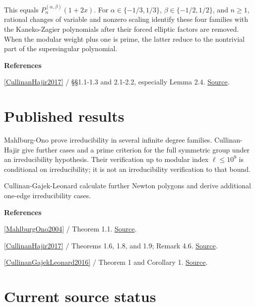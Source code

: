 \documentclass[11pt,a4paper,oneside,openany]{book}
\newcommand{\atlasdisplay}[1]{\par\begingroup\centering\vspace{3pt}\noindent\adjustbox{max width=\linewidth}{\(\displaystyle #1\)}\par\vspace{5pt}\endgroup}
\newenvironment{sources}{\par\smallskip\begingroup\footnotesize\color{atlasgray}\leftskip=10pt\setlength{\parskip}{2pt}}{\par\endgroup\smallskip}
\begin{document}
\atlasdisplay{J_n^{(\alpha,\beta)}(x)=\sum_{j=0}^n\binom{n+\alpha}{n-j}\binom{n+\alpha+\beta+j}{j}x^j.}
\color{black} This equals \(P_n^{(\alpha,\beta)}(1+2x)\). For \(\alpha\in\{-1/3,1/3\}\), \(\beta\in\{-1/2,1/2\}\), and \(n\ge1\), rational changes of variable and nonzero scaling identify these four families with the Kaneko-Zagier polynomials after their forced elliptic factors are removed. When the modular weight plus one is prime, the latter reduce to the nontrivial part of the supersingular polynomial.\par
\begin{sources}
\textbf{References}\par\smallskip
\noindent\hyperlink{ref:CullinanHajir2017}{[CullinanHajir2017]} / §§1.1-1.3 and 2.1-2.2, especially Lemma 2.4.  \href{https://doi.org/10.1090/proc/13212}{Source}.\par
\end{sources}\color{black}
\section{Published results}
\color{black} Mahlburg-Ono prove irreducibility in several infinite degree families. Cullinan-Hajir give further cases and a prime criterion for the full symmetric group under an irreducibility hypothesis. Their verification up to modular index \(\ell\le10^9\) is conditional on irreducibility; it is not an irreducibility verification to that bound.\par
\color{black} Cullinan-Gajek-Leonard calculate further Newton polygons and derive additional one-edge irreducibility cases.\par
\begin{sources}
\textbf{References}\par\smallskip
\noindent\hyperlink{ref:MahlburgOno2004}{[MahlburgOno2004]} / Theorem 1.1.  \href{https://doi.org/10.4064/aa113-1-4}{Source}.\par
\noindent\hyperlink{ref:CullinanHajir2017}{[CullinanHajir2017]} / Theorems 1.6, 1.8, and 1.9; Remark 4.6.  \href{https://doi.org/10.1090/proc/13212}{Source}.\par
\noindent\hyperlink{ref:CullinanGajekLeonard2016}{[CullinanGajekLeonard2016]} / Theorem 1 and Corollary 1.  \href{https://doi.org/10.1007/s40993-016-0064-4}{Source}.\par
\end{sources}\color{black}
\section{Current source status}
\end{document}

